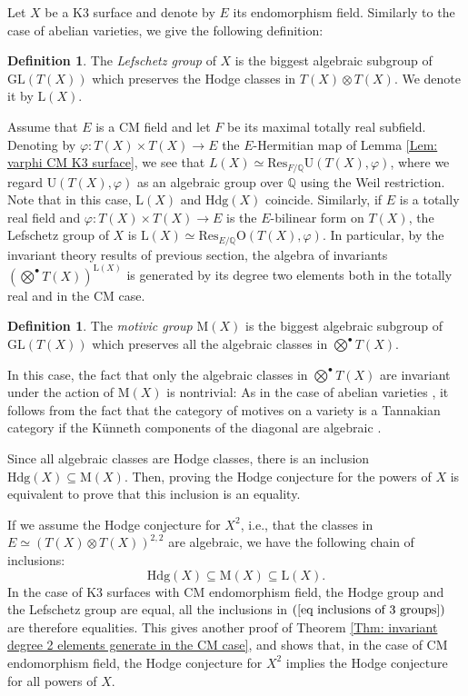 \documentclass[11pt,twoside,a4paper]{amsart}
\newcommand{\0}{\mathscr{O}}
\newcommand{\Q}{\mathbb{Q}}
\theoremstyle{plain}
\theoremstyle{definition}
\newtheorem{defn}[thm]{Definition}
\theoremstyle{remark}
\begin{document}
\smallskip

Let $X$ be a K3 surface and denote by $E$ its endomorphism field. Similarly to the case of abelian varieties, we give the following definition:
\begin{defn}
The \textit{Lefschetz group} of $X$ is the biggest algebraic subgroup of $\mathrm{GL}(T(X))$ which preserves the Hodge classes in $T(X)\otimes T(X)$. We denote it by $\mathrm{L}(X)$.
\end{defn}
Assume that $E$ is a CM field and let $F$ be its maximal totally real subfield. Denoting by $\varphi\colon T(X)\times T(X)\rightarrow E$ the $E$-Hermitian map of Lemma \ref{Lem: varphi CM K3 surface}, we see that  
$L(X)\simeq \mathrm{Res}_{F/\Q} \mathrm{U}(T(X), \varphi)$, where we regard $\mathrm{U}(T(X), \varphi)$ as an algebraic group over $\Q$ using the Weil restriction. Note that in this case, $\mathrm{L}(X)$ and $\mathrm{Hdg}(X)$ coincide.
Similarly, if $E$ is a totally real field and $\varphi\colon T(X)\times T(X)\rightarrow E$ is the $E$-bilinear form on $T(X)$, the Lefschetz group of $X$ is $\mathrm{L}(X)\simeq \mathrm{Res}_{E/\Q} \mathrm{O}(T(X), \varphi)$.
In particular, by the invariant theory results of previous section, the algebra of invariants
$
\textstyle\left(\bigotimes^\bullet T(X)\right)^{\mathrm{L}(X)}
$
is generated by its degree two elements both in the totally real and in the CM case.
\begin{defn}
The \textit{motivic group} $\mathrm{M}(X)$ is the biggest algebraic subgroup of $\mathrm{GL}(T(X))$ which preserves all the algebraic classes in $\bigotimes^\bullet T(X)$.
\end{defn}
In this case, the fact that only the algebraic classes in $\bigotimes^\bullet T(X)$ are invariant under the action of ${\mathrm{M}(X)}$ is nontrivial: As in the case of abelian varieties \cite[App. A]{milne2021tate}, it follows from the fact that the category of motives on a variety is a Tannakian category if the K\"{u}nneth components of the diagonal are algebraic \cite[Cor.\ 3]{jannsen1992motives}.

\smallskip

Since all algebraic classes are Hodge classes, there is an inclusion
$\mathrm{Hdg}(X)\subseteq \mathrm{M}(X)$. Then, proving the Hodge conjecture for the powers of $X$ is equivalent to prove that this inclusion is an equality.

\smallskip

If we assume the Hodge conjecture for $X^2$, i.e., that the classes in $E\simeq \left(T(X)\otimes T(X)\right)^{2,2}$ are algebraic, we have the following chain of inclusions:
\begin{equation}
    \label{eq inclusions of 3 groups}
    \mathrm{Hdg}(X)\subseteq \mathrm{M}(X)\subseteq \mathrm{L}(X).
\end{equation}
In the case of K3 surfaces with CM endomorphism field, the Hodge group and the Lefschetz group are equal, all the inclusions in $(\ref{eq inclusions of 3 groups})$ are therefore equalities. This gives another proof of Theorem \ref{Thm: invariant degree 2 elements generate in the CM case}, and shows that, in the case of CM endomorphism field, the Hodge conjecture for $X^2$ implies the Hodge conjecture for all powers of $X$.
\end{document}
